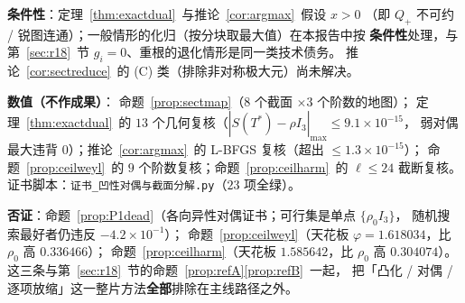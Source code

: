 \documentclass[UTF8,11pt]{ctexart}
\theoremstyle{definition}
\begin{document}
\textbf{条件性}：定理~\ref{thm:exactdual}~与推论~\ref{cor:argmax}~假设 $x>0$
（即 $Q_+$ 不可约 / 锐图连通）；一般情形的化归（按分块取最大值）在本报告中按
\textbf{条件性}处理，与第~\ref{sec:r18}~节 $g_i=0$、重根的退化情形是同一类技术债务。
推论~\ref{cor:sectreduce}~的 (C) 类（排除非对称极大元）尚未解决。

\textbf{数值（不作成果）}：
命题~\ref{prop:sectmap}（$8$ 个截面 $\times3$ 个阶数的地图）；
定理~\ref{thm:exactdual}~的 $13$ 个几何复核（$|S(T^*)-\rho I_3|_{\max}\le9.1\times10^{-15}$，
弱对偶最大违背 $0$）；推论~\ref{cor:argmax}~的 L-BFGS 复核（超出 $\le1.3\times10^{-15}$）；
命题~\ref{prop:ceilweyl}~的 $9$ 个阶数复核；命题~\ref{prop:ceilharm}~的 $\ell\le24$ 截断复核。
证书脚本：\texttt{证书\_凹性对偶与截面分解.py}（$23$ 项全绿）。

\textbf{否证}：命题~\ref{prop:P1dead}（各向异性对偶证书；可行集是单点 $\{\rho_0I_3\}$，
随机搜索最好者仍违反 $-4.2\times10^{-1}$）；
命题~\ref{prop:ceilweyl}（天花板 $\varphi=1.618034$，比 $\rho_0$ 高 $0.336466$）；
命题~\ref{prop:ceilharm}（天花板 $1.585642$，比 $\rho_0$ 高 $0.304074$）。
这三条与第~\ref{sec:r18}~节的命题~\ref{prop:refA}\ref{prop:refB}~一起，
把「凸化 / 对偶 / 逐项放缩」这一整片方法\textbf{全部}排除在主线路径之外。
\end{document}
